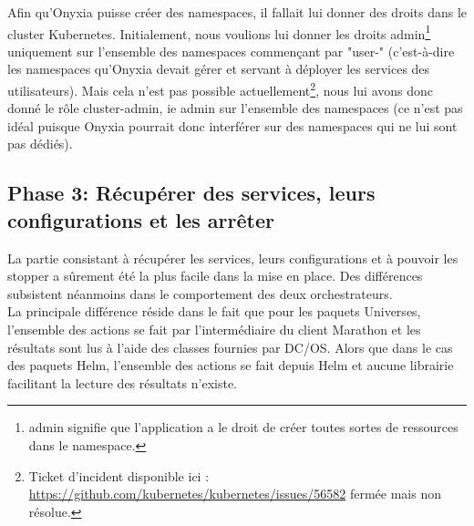 \documentclass[11pt,fleqn]{book} %
\begin{document}
Afin qu'Onyxia puisse créer des namespaces, il fallait lui donner des droits dans le cluster Kubernetes. Initialement, nous voulions lui donner les droits admin\footnote{admin signifie que l'application a le droit de créer toutes sortes de ressources dans le namespace.} uniquement sur l'ensemble des namespaces commençant par "user-" (c'est-à-dire les namespaces qu'Onyxia devait gérer et servant à déployer les services des utilisateurs). Mais cela n'est pas possible actuellement\footnote{Ticket d'incident disponible ici : \url{https://github.com/kubernetes/kubernetes/issues/56582} fermée mais non résolue.}, nous lui avons donc donné le rôle cluster-admin, ie admin sur l'ensemble des namespaces (ce n'est pas idéal puisque Onyxia pourrait donc interférer sur des namespaces qui ne lui sont pas dédiés).

\subsection{Phase 3: Récupérer des services, leurs configurations et les arrêter}
La partie consistant à récupérer les services, leurs configurations et à pouvoir les stopper a sûrement été la plus facile dans la mise en place. Des différences subsistent néanmoins dans le comportement des deux orchestrateurs. \\

La principale différence réside dans le fait que pour les paquets Universes, l'ensemble des actions se fait par l'intermédiaire du client Marathon  et les résultats sont lus à l'aide des classes fournies par DC/OS. Alors que dans le cas des paquets Helm, l'ensemble des actions se fait depuis Helm et aucune librairie facilitant la lecture des résultats n'existe.\\
\end{document}
